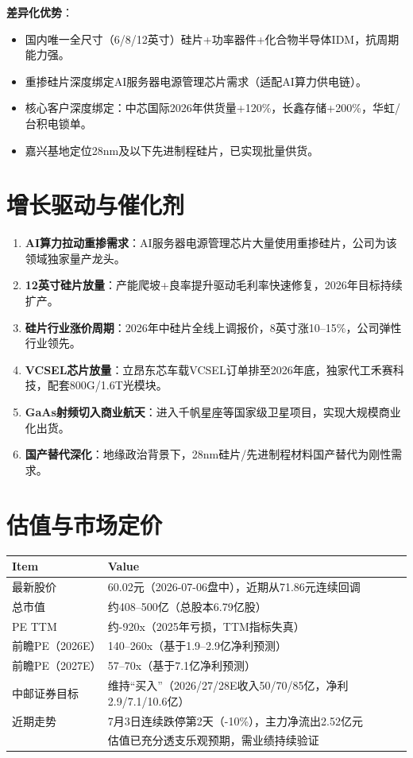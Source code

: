\documentclass[a4paper,11pt,fontset=none]{ctexart}
\begin{document}
\textbf{差异化优势}：
\begin{itemize}
  \item 国内唯一全尺寸（6/8/12英寸）硅片+功率器件+化合物半导体IDM，抗周期能力强。
  \item 重掺硅片深度绑定AI服务器电源管理芯片需求（适配AI算力供电链）。
  \item 核心客户深度绑定：中芯国际2026年供货量+120\%，长鑫存储+200\%，华虹/台积电锁单。
  \item 嘉兴基地定位28nm及以下先进制程硅片，已实现批量供货。
\end{itemize}

\section{增长驱动与催化剂}

\begin{enumerate}
  \item \textbf{AI算力拉动重掺需求}：AI服务器电源管理芯片大量使用重掺硅片，公司为该领域独家量产龙头。
  \item \textbf{12英寸硅片放量}：产能爬坡+良率提升驱动毛利率快速修复，2026年目标持续扩产。
  \item \textbf{硅片行业涨价周期}：2026年中硅片全线上调报价，8英寸涨10--15\%，公司弹性行业领先。
  \item \textbf{VCSEL芯片放量}：立昂东芯车载VCSEL订单排至2026年底，独家代工禾赛科技，配套800G/1.6T光模块。
  \item \textbf{GaAs射频切入商业航天}：进入千帆星座等国家级卫星项目，实现大规模商业化出货。
  \item \textbf{国产替代深化}：地缘政治背景下，28nm硅片/先进制程材料国产替代为刚性需求。
\end{enumerate}

\section{估值与市场定价}

\begin{tabularx}{\textwidth}{L{3cm}X}
\toprule
\textbf{Item} & \textbf{Value} \\
\midrule
最新股价 & 60.02元（2026-07-06盘中），近期从71.86元连续回调 \\
总市值 & 约408--500亿（总股本6.79亿股） \\
PE TTM & 约-920x（2025年亏损，TTM指标失真） \\
前瞻PE（2026E） & 140--260x（基于1.9--2.9亿净利预测） \\
前瞻PE（2027E） & 57--70x（基于7.1亿净利预测） \\
中邮证券目标 & 维持``买入''（2026/27/28E收入50/70/85亿，净利2.9/7.1/10.6亿） \\
近期走势 & 7月3日连续跌停第2天（-10\%），主力净流出2.52亿元 \\
 & 估值已充分透支乐观预期，需业绩持续验证 \\
\bottomrule
\end{tabularx}
\end{document}
